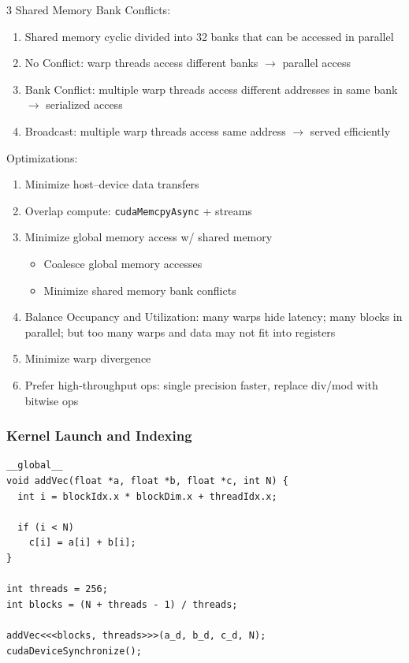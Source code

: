\documentclass[12pt, a4paper]{article}
\begin{document}
\begin{multicols*}{3}
Shared Memory Bank Conflicts:
\begin{enumerate}[\roman*.]
  \item Shared memory cyclic divided into 32 banks that can be accessed in parallel
  \item No Conflict: warp threads access different banks $\rightarrow$ parallel access
  \item Bank Conflict: multiple warp threads access different addresses in same bank $\rightarrow$ serialized access
  \item Broadcast: multiple warp threads access same address $\rightarrow$ served efficiently
\end{enumerate}

Optimizations:
\begin{enumerate}[\roman*.]
  \item Minimize host--device data transfers 
  \item Overlap compute: \lstinline|cudaMemcpyAsync| + streams
  \item Minimize global memory access w/ shared memory
    \begin{itemize}[leftmargin=*]\vspace{3pt}
      \item Coalesce global memory accesses
      \item Minimize shared memory bank conflicts 
    \end{itemize}
  \item Balance Occupancy and Utilization: many warps hide latency; many blocks in parallel; but too many warps and data may not fit into registers
  \item Minimize warp divergence 
  \item Prefer high-throughput ops: single precision faster, replace div/mod with bitwise ops
\end{enumerate}

\colbreak
\subsubsection{Kernel Launch and Indexing}
\begin{lstlisting}[basicstyle=\ttfamily\scriptsize]
__global__
void addVec(float *a, float *b, float *c, int N) {
  int i = blockIdx.x * blockDim.x + threadIdx.x;

  if (i < N)
    c[i] = a[i] + b[i];
}

int threads = 256;
int blocks = (N + threads - 1) / threads;

addVec<<<blocks, threads>>>(a_d, b_d, c_d, N);
cudaDeviceSynchronize();
\end{lstlisting}


\end{multicols*}
\end{document}

